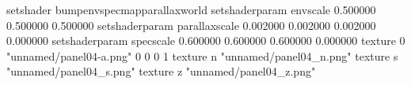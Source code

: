setshader bumpenvspecmapparallaxworld
setshaderparam envscale 0.500000 0.500000 0.500000
setshaderparam parallaxscale 0.002000 0.002000 0.002000 0.000000
setshaderparam specscale 0.600000 0.600000 0.600000 0.000000
texture 0 "unnamed/panel04-a.png" 0 0 0 1
texture n "unnamed/panel04_n.png"
texture s "unnamed/panel04_s.png"
texture z "unnamed/panel04_z.png"